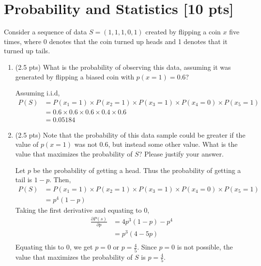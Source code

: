 \documentclass[a4paper]{article}
\theoremstyle{definition}
\newcommand{\pd}[2]{\frac{\partial #1}{\partial #2}}
\newenvironment{soln}{
	\leavevmode\color{blue}\ignorespaces
}{}
\begin{document}
	
	
	
	\section{Probability and Statistics [10 pts]}
	Consider a sequence of data $S = (1, 1, 1, 0, 1)$ created by flipping a coin $x$ five times, where 0 denotes that the coin turned up heads and 1 denotes that it turned up tails.
	\begin{enumerate}
		\item 	(2.5 pts) What is the probability of observing this data, assuming it was generated by flipping a biased coin with $p(x=1) = 0.6$?
		
		\begin{soln}  
			Assuming i.i.d,
			\begin{align*}
				P(S) &= P(x_1 = 1) \times P(x_2 = 1) \times P(x_3 = 1) \times P(x_4 = 0) \times P(x_5 = 1) \\
					 &= 0.6 \times 0.6 \times 0.6 \times 0.4 \times 0.6 \\
					 &= 0.05184
			\end{align*}
		\end{soln}
		
		\item 	(2.5 pts) Note that the probability of this data sample could be greater if the value of $p(x = 1)$ was not $0.6$, but instead some other value. What is the value that maximizes the probability of $S$? Please justify your answer.\\
		\begin{soln}
			Let $p$ be the probability of getting a head. Thus the probability of getting a tail is $1-p$. Then, 
			\begin{align*}
				P(S) &= P(x_1 = 1) \times P(x_2 = 1) \times P(x_3 = 1) \times P(x_4 = 0) \times P(x_5 = 1) \\
					 &= p^4(1-p)
			\end{align*}
			Taking the first derivative and equating to 0,
			\begin{align*}
				\pd{P(s)}{p} &= 4p^3(1-p) - p^4 \\
							&= p^3(4-5p) \\
			\end{align*}
			Equating this to 0, we get $p = 0$ or $p = \frac{4}{5}$. Since $p = 0$ is not possible, the value that maximizes the probability of $S$ is $p = \frac{4}{5}$.

		\end{soln}
		

\end{enumerate}
\end{document}
